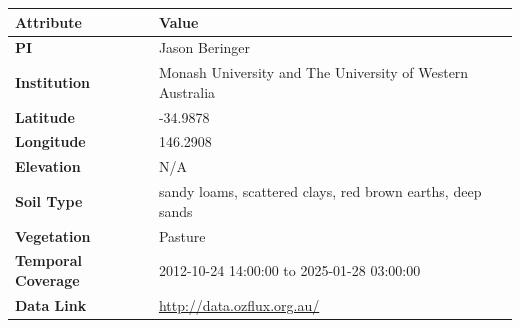 \documentclass[11pt,a4paper]{article}
\begin{document}
\begin{longtable}{p{4.5cm}p{10.5cm}}
\toprule
\textbf{Attribute} & \textbf{Value} \\
\midrule
\endhead
\bottomrule
\endfoot
\textbf{PI} & Jason Beringer \\
\textbf{Institution} & Monash University and The University of Western Australia \\
\textbf{Latitude} & -34.9878 \\
\textbf{Longitude} & 146.2908 \\
\textbf{Elevation} & N/A \\
\textbf{Soil Type} & sandy loams, scattered clays, red brown earths, deep sands \\
\textbf{Vegetation} & Pasture \\
\textbf{Temporal Coverage} & 2012-10-24 14:00:00 to 2025-01-28 03:00:00 \\
\textbf{Data Link} & \url{http://data.ozflux.org.au/} \\
\end{longtable}

\newpage
\end{document}
